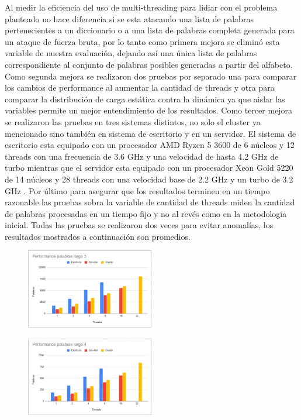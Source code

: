 \documentclass[conference]{IEEEtran}
\begin{document}
Al medir la eficiencia del uso de multi-threading para lidiar con el problema planteado no hace diferencia si se esta atacando una lista de palabras pertenecientes a un diccionario o a una lista de palabras completa generada para un ataque de fuerza bruta, por lo tanto como primera mejora se eliminó esta variable de nuestra evaluación, dejando así una única lista de palabras correspondiente al conjunto de palabras posibles generadas a partir del alfabeto. 
Como segunda mejora se realizaron dos pruebas por separado una para comparar los cambios de performance al aumentar la cantidad de threads y otra para comparar la distribución de carga estática contra la dinámica ya que aislar las variables permite un mejor entendimiento de los resultados.
Como tercer mejora se realizaron las pruebas en tres sistemas distintos, no solo el cluster ya mencionado sino también en sistema de escritorio y en un servidor. El sistema de escritorio esta equipado con un procesador AMD Ryzen 5 3600 de 6 núcleos y 12 threads con una frecuencia de 3.6 GHz y una velocidad de hasta 4.2 GHz de turbo \cite{b7} mientras que el servidor esta equipado con un procesador Xeon Gold 5220 de 14 núcleos y 28 threads con una velocidad base de 2.2 GHz y un turbo de 3.2 GHz \cite{b8}.
Por último para asegurar que los resultados terminen en un tiempo razonable las pruebas sobra la variable de cantidad de threads miden la cantidad de palabras procesadas en un tiempo fijo y no al revés como en la metodología inicial. Todas las pruebas se realizaron dos veces para evitar anomalías, los resultados mostrados a continuación son promedios.

\begin{figure}[h]
  \centering
   \includegraphics[width=0.5\textwidth]{Captura3.PNG}
 \end{figure}

\begin{figure}[h]
  \centering
   \includegraphics[width=0.5\textwidth]{Captura5.PNG}
 \end{figure}
\end{document}
